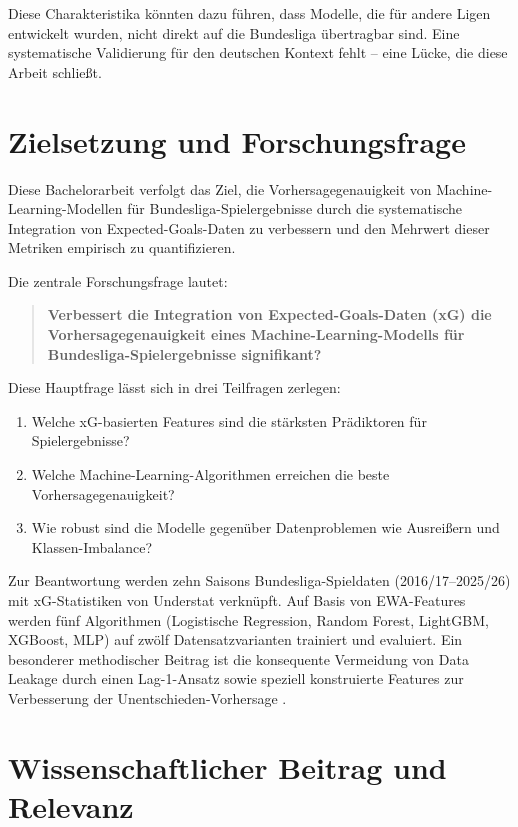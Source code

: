 Diese Charakteristika könnten dazu führen, dass Modelle, die für andere
Ligen entwickelt wurden, nicht direkt auf die Bundesliga übertragbar sind.
Eine systematische Validierung für den deutschen Kontext fehlt -- eine
Lücke, die diese Arbeit schließt.

\section{Zielsetzung und Forschungsfrage}

Diese Bachelorarbeit verfolgt das Ziel, die Vorhersagegenauigkeit von
Machine-Learning-Modellen für Bundesliga-Spielergebnisse durch die
systematische Integration von Expected-Goals-Daten zu verbessern und den
Mehrwert dieser Metriken empirisch zu quantifizieren.

Die zentrale Forschungsfrage lautet:

\begin{quote}
    \textbf{Verbessert die Integration von Expected-Goals-Daten (xG) die
    Vorhersagegenauigkeit eines Machine-Learning-Modells für
    Bundesliga-Spielergebnisse signifikant?}
\end{quote}

Diese Hauptfrage lässt sich in drei Teilfragen zerlegen:

\begin{enumerate}
    \item Welche xG-basierten Features sind die stärksten Prädiktoren
          für Spielergebnisse?
    \item Welche Machine-Learning-Algorithmen erreichen die beste
          Vorhersagegenauigkeit?
    \item Wie robust sind die Modelle gegenüber Datenproblemen wie
          Ausreißern und Klassen-Imbalance?
\end{enumerate}

Zur Beantwortung werden zehn Saisons Bundesliga-Spieldaten
(2016/17--2025/26) mit xG-Statistiken von Understat \cite{Understat2024}
verknüpft. Auf Basis von EWA-Features \cite{Brown1956,HyndmanAthanasopoulos2021}
werden fünf Algorithmen (Logistische Regression, Random Forest, LightGBM,
XGBoost, MLP) auf zwölf Datensatzvarianten trainiert und evaluiert. Ein
besonderer methodischer Beitrag ist die konsequente Vermeidung von
Data Leakage durch einen Lag-1-Ansatz sowie speziell konstruierte
Features zur Verbesserung der Unentschieden-Vorhersage \cite{ChawlaEtAl2002}.

\section{Wissenschaftlicher Beitrag und Relevanz}

